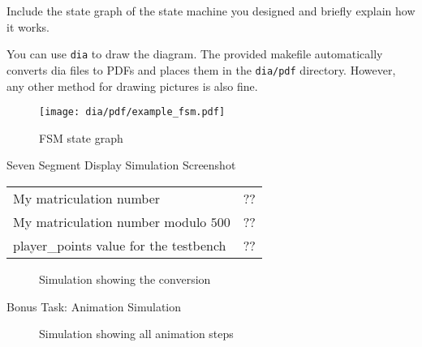 \documentclass[10pt,a4paper,titlepage,oneside]{article}
\begin{document}
\begin{qa}{Include the state graph of the state machine you designed and briefly explain how it works.}

You can use \texttt{dia} to draw the diagram. The provided makefile automatically converts dia files to PDFs and places them in the \texttt{dia/pdf} directory.
However, any other method for drawing pictures is also fine. 

\begin{figure}[h!]
	\centering
	\texttt{[image: dia/pdf/example\_fsm.pdf]}
	\caption{FSM state graph}
\end{figure}

\end{qa}


\begin{qa}{Seven Segment Display Simulation Screenshot}

\begin{center}
\begin{tabular}{ll}
\hline\hline
My matriculation number                          & ?? \\ 
My matriculation number modulo $500$             & ?? \\ 
\textsf{player\_points} value for the testbench  & ?? \\ \hline
\end{tabular}
\end{center}

\begin{figure}[h!]
	\centering
	\dummyimage
	\caption{Simulation showing the conversion}
\end{figure}

\end{qa}

\begin{qa}{Bonus Task: Animation Simulation}
\begin{figure}[h!]
	\centering
	\dummyimage
	\caption{Simulation showing all animation steps}
\end{figure}
\end{qa}
\end{document}
